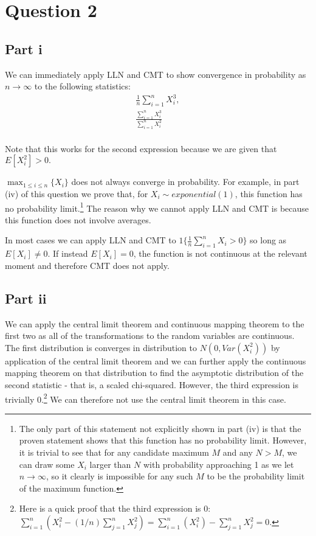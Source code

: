 \documentclass[11pt]{article} %
\begin{document}
\section{Question 2}
\subsection{Part i}
We can immediately apply LLN and CMT to show convergence in probability as $n \rightarrow \infty$ to the following statistics:
\begin{align*}
\frac{1}{n}\sum_{i=1}^n X_i^3, \\
\frac{\sum_{i=1}^n X_i^3}{\sum_{i=1}^n X_i^2}\\
\end{align*}

Note that this works for the second expression because we are given that $E[X_i^2]>0.$

$\max_{1\leq i\leq n} \{X_i\}$ does not always converge in probability. For example, in part (iv) of this question we prove that, for $X_i \sim exponential(1)$, this function has no probability limit.\footnote{The only part of this statement not explicitly shown in part (iv) is that the proven statement shows that this function has no probability limit. However, it is trivial to see that for any candidate maximum $M$ and any $N>M$, we can draw some $X_i$ larger than $N$ with probability approaching 1 as we let $n\rightarrow \infty$, so it clearly is impossible for any such $M$ to be the probability limit of the maximum function.} The reason why we cannot apply LLN and CMT is because this function does not involve averages.%

In most cases we can apply LLN and CMT to $1\{ \frac{1}{n}\sum_{i=1}^n X_i >0 \}$ so long as $E[X_i]\neq 0.$ If instead $E[X_i]= 0$, the function is not continuous at the relevant moment and therefore CMT does not apply.

\subsection{Part ii}
We can apply the central limit theorem and continuous mapping theorem to the first two as all of the transformations to the random variables are continuous. The first distribution is converges in distribution to $N(0,Var(X_i^2))$ by application of the central limit theorem and we can further apply the continuous mapping theorem on that distribution to find the asymptotic distribution of the second statistic - that is, a scaled chi-squared. However, the third expression is trivially 0.\footnote{Here is a quick proof that the third expression is 0: $\sum_{i=1}^n (X_i^2 - (1/n)\sum_{j=1}^nX_j^2) = \sum_{i=1}^n (X_i^2) - \sum_{j=1}^nX_j^2 = 0.$} We can therefore not use the central limit theorem in this case.
\end{document}
